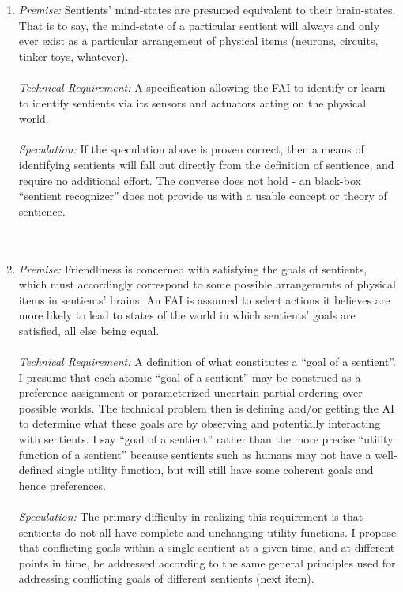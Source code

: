 \documentclass[twoside,11pt]{article}
\begin{document}
\begin{enumerate}
\item \emph{Premise:}
 Sentients' mind-states are presumed equivalent to their brain-states. That is to say, the mind-state of a particular sentient will always and only ever exist as a particular arrangement of physical items (neurons, circuits, tinker-toys, whatever). \\ 
\\ 
\emph{Technical Requirement:}
 A specification allowing the FAI to identify or learn to identify sentients via its sensors and actuators acting on the physical world. \\ 
\\ 
\emph{Speculation:}
 If the speculation above is proven correct, then a means of identifying sentients will fall out directly from the definition of sentience, and require no additional effort. The converse does not hold - an black-box ``sentient recognizer'' does not provide us with a usable concept or theory of sentience. \\ 
\\ 
\\ 

\item \emph{Premise:}
 Friendliness is concerned with satisfying the goals of sentients, which must accordingly correspond to some possible arrangements of physical items in sentients' brains. An FAI is assumed to select actions it believes are more likely to lead to states of the world in which sentients' goals are satisfied, all else being equal. \\ 
\\ 
\emph{Technical Requirement:}
 A definition of what constitutes a ``goal of a sentient''. I presume that each atomic ``goal of a sentient'' may be construed as a preference assignment or parameterized uncertain partial ordering over possible worlds. The technical problem then is defining and/or getting the AI to determine what these goals are by observing and potentially interacting with sentients. I say ``goal of a sentient'' rather than the more precise ``utility function of a sentient'' because sentients such as humans may not have a well-defined single utility function, but will still have some coherent goals and hence preferences. \\ 
\\ 
\emph{Speculation:}
 The primary difficulty in realizing this requirement is that sentients do not all have complete and unchanging utility functions. I propose that conflicting goals within a single sentient at a given time, and at different points in time, be addressed according to the same general principles used for addressing conflicting goals of different sentients (next item). \\ 
\\ 
\\ 


\end{enumerate}
\end{document}
